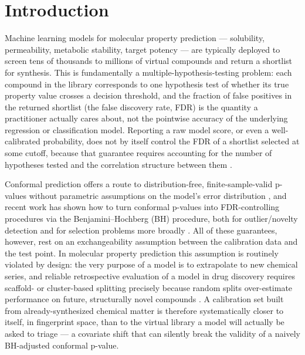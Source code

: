\documentclass[11pt]{article}
\begin{document}
\section{Introduction}

Machine learning models for molecular property prediction --- solubility,
permeability, metabolic stability, target potency --- are typically deployed to
screen tens of thousands to millions of virtual compounds and return a shortlist
for synthesis. This is fundamentally a multiple-hypothesis-testing problem: each
compound in the library corresponds to one hypothesis test of whether its true
property value crosses a decision threshold, and the fraction of false positives
in the returned shortlist (the false discovery rate, FDR) is the quantity a
practitioner actually cares about, not the pointwise accuracy of the underlying
regression or classification model. Reporting a raw model score, or even a
well-calibrated probability, does not by itself control the FDR of a shortlist
selected at some cutoff, because that guarantee requires accounting for the
number of hypotheses tested and the correlation structure between them
\citep{benjamini1995}.

Conformal prediction offers a route to distribution-free, finite-sample-valid
p-values without parametric assumptions on the model's error distribution
\citep{vovk2005,shafer2008}, and recent work has shown how to turn conformal
p-values into FDR-controlling procedures via the Benjamini--Hochberg (BH)
procedure, both for outlier/novelty detection \citep{bates2023} and for
selection problems more broadly \citep{jin2023selection}. All of these
guarantees, however, rest on an exchangeability assumption between the
calibration data and the test point. In molecular property prediction this
assumption is routinely violated by design: the very purpose of a model is to
extrapolate to new chemical series, and reliable retrospective evaluation of a
model in drug discovery requires scaffold- or cluster-based splitting precisely
because random splits over-estimate performance on future, structurally novel
compounds \citep{martin2017,schiebroek2026}. A calibration set built from
already-synthesized chemical matter is therefore systematically closer to
itself, in fingerprint space, than to the virtual library a model will actually
be asked to triage --- a covariate shift that can silently break the validity of
a naively BH-adjusted conformal p-value.
\end{document}
